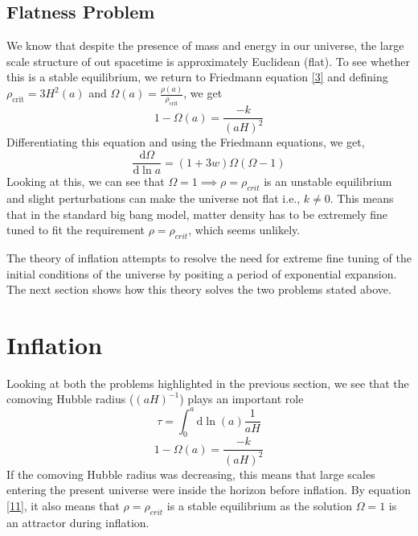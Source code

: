 \documentclass[aps,prd,reprint,preprintnumbers,showpacs,floatfix,nofootinbib,superscript address]{revtex4-2}
\begin{document}
\subsection{Flatness Problem}
We know that despite the presence of mass and energy in our universe, the large scale structure of out spacetime is approximately Euclidean (flat). To see whether this is a stable equilibrium, we return to Friedmann equation \ref{3} and defining $\rho_{\text{crit}} = 3H^2(a)$ and $\Omega(a) = \frac{\rho(a)}{\rho_{\text{crit}}}$, we get
\begin{equation}
    1 - \Omega(a) = \frac{-k}{(aH)^2}
\end{equation}
Differentiating this equation and using the Friedmann equations, we get,
\begin{equation}
    \frac{\mathrm{d}\Omega}{\mathrm{d} \ln a} = (1+3w)\Omega(\Omega-1)
\end{equation}
Looking at this, we can see that $\Omega = 1  \implies \rho = \rho_{crit}$ is an unstable equilibrium and slight perturbations can make the universe not flat i.e., $k \neq 0$. This means that in the standard big bang model, matter density has to be extremely fine tuned to fit the requirement $\rho = \rho_{crit}$, which seems unlikely.

The theory of inflation attempts to resolve the need for extreme fine tuning of the initial conditions of the universe by positing a period of exponential expansion. The next section shows how this theory solves the two problems stated above.

\section{Inflation}\label{Inflation}

Looking at both the problems highlighted in the previous section, we see that the comoving Hubble radius ($(aH)^{-1}$) plays an important role
\begin{equation}    \label{10}
    \tau = \int_{0}^{a} \mathrm{d} \ln (a) \frac{1}{aH}
\end{equation}
\begin{equation} \label{11}
    1 - \Omega (a) = \frac{-k}{(aH)^2}
\end{equation}
If the comoving Hubble radius was decreasing, this means that large scales entering the present universe were inside the horizon before inflation. By equation \ref{11}, it also means that $\rho = \rho_{crit}$ is a stable equilibrium as the solution $\Omega = 1$ is an attractor during inflation.
\end{document}

